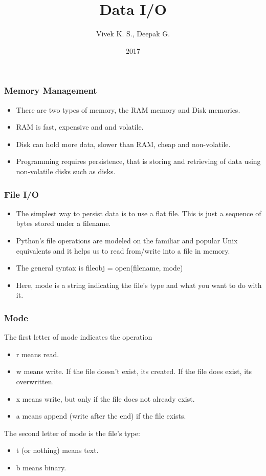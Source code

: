 \documentclass{beamer}
\title{Data I/O}
\author{Vivek K. S., Deepak G.}
\institute{Information Systems Decision Sciences (ISDS)\\
MUMA College of Business\\
University of South Florida \\
Tampa, Florida}
\date{2017}
\begin{document}
\frame{\titlepage}

\begin{frame}
\frametitle{Memory Management}
\begin{itemize}
\item There are two types of memory, the RAM memory and Disk memories.
\item RAM is fast, expensive and and volatile.
\item Disk can hold more data, slower than RAM, cheap and non-volatile.
\item Programming requires persistence, that is storing and retrieving of data using non-volatile disks such as disks.
\end{itemize}
\end{frame}

\begin{frame}
\frametitle{File I/O}
\begin{itemize}
\item The simplest way to persist data is to use a flat file. This is just a sequence of bytes stored under a filename.
\item Python's file operations are modeled on the familiar and popular Unix equivalents and it helps us to read from/write into a file in memory.
\item The general syntax is 
fileobj = open(filename, mode)
\item Here, mode is a string indicating the file’s type and what you want to do with it.

\end{itemize}
\end{frame}

\begin{frame}
\frametitle{Mode}
The first letter of mode indicates the operation
\begin{itemize}
\item r means read.
\item w means write. If the file doesn't exist, its created. If the file does exist, its overwritten.
\item x means write, but only if the file does not already exist.
\item a means append (write after the end) if the file exists.
\end{itemize}
The second letter of mode is the file’s type:
\begin{itemize}
\item t (or nothing) means text.
\item b means binary.
\end{itemize}
\end{frame}
\end{document}

